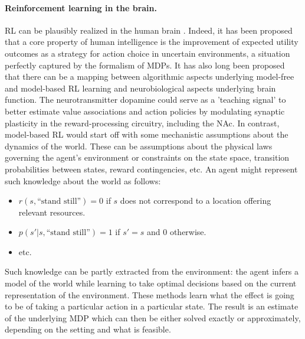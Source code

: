 \documentclass[10pt,letterpaper]{article}
\begin{document}


\paragraph*{Reinforcement learning in the brain.}
RL can be plausibly realized in the human brain \citep{doherty2015structure, daw2014algorithmic}.
Indeed,
it has been proposed \citep{gershman2015computational} that a core property of human intelligence is the improvement
of expected utility outcomes as a strategy for action choice in uncertain
environments, a situation perfectly captured by the formalism of MDPs.
It has also long been proposed \citep{dayan2008decision} that there
can be a mapping between algorithmic aspects
underlying model-free and model-based RL learning
and neurobiological aspects underlying brain function.
The neurotransmitter dopamine could serve
as a 'teaching signal' to better estimate value associations
and action policies by modulating
synaptic plasticity in the reward-processing circuitry, including the NAc.
In contrast, model-based RL would start off with some mechanistic assumptions about the dynamics of the world.
These can be assumptions about the physical laws governing the agent's environment or constraints on the state space, transition probabilities between states,
reward contingencies, etc.
An agent might represent such knowledge about the world as follows:
\begin{itemize}
\item $r(s, \text{``stand still''}) = 0$ if $s$ does not correspond to a location
offering relevant resources.
\item $p(s'|s,\text{``stand still''}) = 1$ if $s'=s$ and $0$ otherwise.
\item etc.
\end{itemize}
Such knowledge can be partly extracted from the environment: the agent infers a model of the world while learning to take optimal decisions based on the current representation of the environment. These methods learn what the effect is going to be of taking a particular action in a particular state. The result is an estimate of the underlying MDP which can then be either solved exactly or approximately, depending on the setting and what is feasible.
\end{document}
